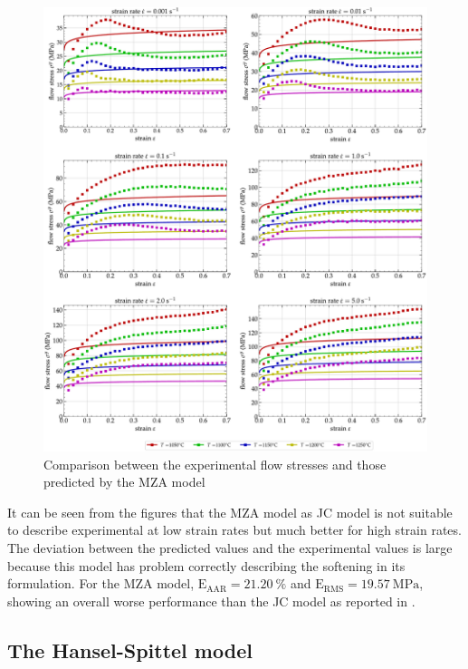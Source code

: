 \documentclass[twoside,english,1p,final,sort&compress]{elsarticle}
\theoremstyle{plain}
\DeclareRobustCommand{\RMSE}{\text{E}_\text{RMS}}
\DeclareRobustCommand{\AARE}{\text{E}_\text{AAR}}
\DeclareRobustCommand{\MPa}{\text{MPa}}
\begin{document}
\begin{figure}[!ht]
\centering
\includegraphics[width=\columnwidth]
{Figures/CompExp-MZA-6}
\caption{Comparison between the experimental flow stresses and those predicted by the MZA model}
\label{fig:CompExp-MZA-6}
\end{figure}
It can be seen from the figures that the MZA model as JC model is not suitable to describe experimental at low strain rates but much better for high strain rates.
The deviation between the predicted values and the experimental values is large because this model has problem correctly describing the softening in its formulation.
For the MZA model, $\AARE=21.20~\%$ and $\RMSE=19.57~\MPa$, showing an overall worse performance than the JC model as reported in \cite{TizeMha-2022}.

\subsection{The Hansel-Spittel model\label{sec:HSmodel}}
\end{document}
